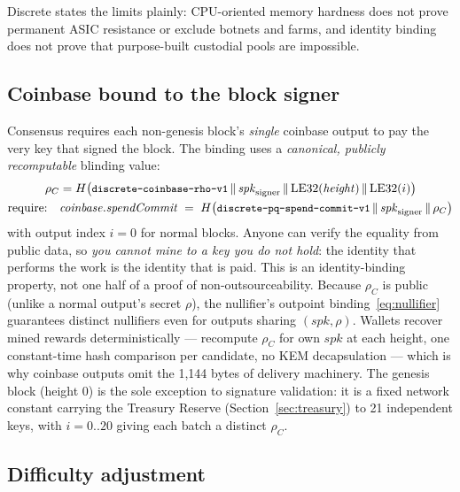 \documentclass[11pt,a4paper]{article}
\newcommand{\code}[1]{\texttt{\small #1}}
\newcommand{\concat}{\,\|\,}
\begin{document}
Discrete states the limits plainly: CPU-oriented memory hardness does not prove
permanent ASIC resistance or exclude botnets and farms, and identity binding
does not prove that purpose-built custodial pools are impossible.

\subsection{Coinbase bound to the block signer}\label{sec:coinbase}

Consensus requires each non-genesis block's \emph{single} coinbase output to
pay the very key that signed the block. The binding uses a
\emph{canonical, publicly recomputable} blinding value:
\begin{align}
\rho_C &= H\bigl(\text{\code{discrete-coinbase-rho-v1}} \concat
        \mathit{spk}_{\mathrm{signer}} \concat \mathrm{LE32}(\mathit{height})
        \concat \mathrm{LE32}(i)\bigr) \label{eq:rhoc}\\
\text{require:}\quad & \mathit{coinbase.spendCommit} \;=\;
   H\bigl(\text{\code{discrete-pq-spend-commit-v1}} \concat
   \mathit{spk}_{\mathrm{signer}} \concat \rho_C\bigr)
\end{align}
with output index $i=0$ for normal blocks. Anyone can verify the equality
from public data, so \emph{you cannot mine to a key you do not hold}: the
identity that performs the work is the identity that is paid. This is an
identity-binding property, not one half of a proof of non-outsourceability.
Because $\rho_C$ is public (unlike a
normal output's secret $\rho$), the nullifier's outpoint
binding~\eqref{eq:nullifier} guarantees distinct nullifiers even for outputs
sharing $(\mathit{spk}, \rho)$. Wallets recover mined rewards
deterministically --- recompute $\rho_C$ for own $\mathit{spk}$ at each
height, one constant-time hash comparison per candidate, no KEM
decapsulation --- which is why coinbase outputs omit the 1{,}144 bytes of
delivery machinery. The genesis block (height 0) is the sole exception to
signature validation: it is a fixed network constant carrying the Treasury Reserve
(Section~\ref{sec:treasury}) to 21 independent keys, with $i = 0..20$ giving
each batch a distinct $\rho_C$.

\subsection{Difficulty adjustment}\label{sec:difficulty}
\end{document}
